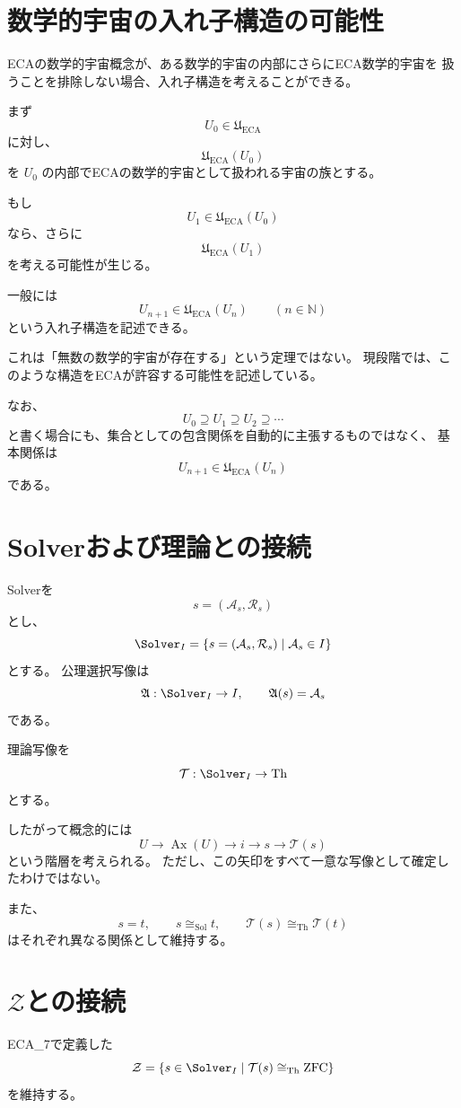 \documentclass[11pt,a4paper]{article}
\begin{document}
\section{数学的宇宙の入れ子構造の可能性}
ECAの数学的宇宙概念が、ある数学的宇宙の内部にさらにECA数学的宇宙を
扱うことを排除しない場合、入れ子構造を考えることができる。

まず
\[
U_0\in\mathfrak U_{\mathrm{ECA}}
\]
に対し、
\[
\mathfrak U_{\mathrm{ECA}}(U_0)
\]
を \(U_0\) の内部でECAの数学的宇宙として扱われる宇宙の族とする。

もし
\[
U_1\in\mathfrak U_{\mathrm{ECA}}(U_0)
\]
なら、さらに
\[
\mathfrak U_{\mathrm{ECA}}(U_1)
\]
を考える可能性が生じる。

一般には
\[
\boxed{
U_{n+1}\in\mathfrak U_{\mathrm{ECA}}(U_n)
}
\qquad(n\in\mathbb N)
\]
という入れ子構造を記述できる。

これは「無数の数学的宇宙が存在する」という定理ではない。
現段階では、このような構造をECAが許容する可能性を記述している。

なお、
\[
U_0\supseteq U_1\supseteq U_2\supseteq\cdots
\]
と書く場合にも、集合としての包含関係を自動的に主張するものではなく、
基本関係は
\[
U_{n+1}\in\mathfrak U_{\mathrm{ECA}}(U_n)
\]
である。

\section{Solverおよび理論との接続}
Solverを
\[
s=(\mathcal A_s,\mathcal R_s)
\]
とし、
\[
\Solver_I
=
\{s=(\mathcal A_s,\mathcal R_s)\mid\mathcal A_s\in I\}
\]
とする。
公理選択写像は
\[
\mathfrak A:\Solver_I\to I,
\qquad
\mathfrak A(s)=\mathcal A_s
\]
である。

理論写像を
\[
\mathcal T:\Solver_I\to\mathrm{Th}
\]
とする。

したがって概念的には
\[
U
\longrightarrow
\operatorname{Ax}(U)
\longrightarrow
i
\longrightarrow
s
\longrightarrow
\mathcal T(s)
\]
という階層を考えられる。
ただし、この矢印をすべて一意な写像として確定したわけではない。

また、
\[
s=t,\qquad
s\cong_{\mathrm{Sol}}t,\qquad
\mathcal T(s)\cong_{\mathrm{Th}}\mathcal T(t)
\]
はそれぞれ異なる関係として維持する。

\section{\(\mathcal Z\)との接続}
ECA\_7で定義した
\[
\mathcal Z
=
\{s\in\Solver_I\mid
\mathcal T(s)\cong_{\mathrm{Th}}\mathrm{ZFC}\}
\]
を維持する。
\end{document}
